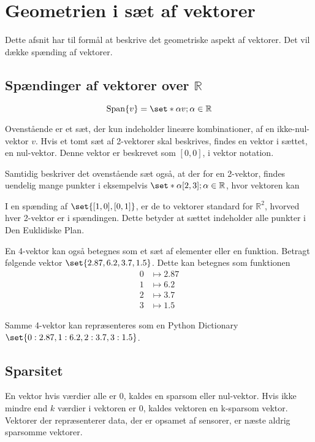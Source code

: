 \section{Geometrien i sæt af vektorer}
Dette afsnit har til formål at beskrive det geometriske aspekt af vektorer.
Det vil dække spænding af vektorer.

\subsection{Spændinger af vektorer over $\mathbb{R}$}
 
\begin{equation}
	\mathrm{Span}\{v\}=\set*{\alpha v; \alpha\in\mathbb{R}}
\end{equation}

Ovenstående er et sæt, der kun indeholder lineære kombinationer, af en ikke-nul-vektor $v$.
Hvis et tomt sæt af 2-vektorer skal beskrives, findes en vektor i sættet, en nul-vektor.
Denne vektor er beskrevet som $[0,0]$, i vektor notation.

Samtidig beskriver det ovenstående sæt også, at der for en 2-vektor, findes uendelig mange punkter i eksempelvis $\set*{\alpha[2,3]; \alpha\in\mathbb{R}}$, hvor vektoren kan 

I en spænding af $\set{[1,0],[0,1]}$, er de to vektorer standard for $\mathbb{R}^2$, hvorved hver 2-vektor er i spændingen.
Dette betyder at sættet indeholder alle punkter i Den Euklidiske Plan.

En 4-vektor kan også betegnes som et sæt af elementer eller en funktion.
Betragt følgende vektor $\set{2.87,6.2,3.7,1.5}$.
Dette kan betegnes som funktionen
\begin{align}
	\label{eqn:vec_func}
	0&\mapsto 2.87\\
	1&\mapsto 6.2\\
	2&\mapsto 3.7\\
	3&\mapsto 1.5
\end{align}

Samme 4-vektor kan repræsenteres som en Python Dictionary $\set{0:2.87, 1:6.2, 2:3.7, 3:1.5}$.

\subsection{Sparsitet}
En vektor hvis værdier alle er 0, kaldes en sparsom eller nul-vektor.
Hvis ikke mindre end $k$ værdier i vektoren er 0, kaldes vektoren en k-sparsom vektor.
Vektorer der repræsenterer data, der er opsamet af sensorer, er næste aldrig sparsomme vektorer.

